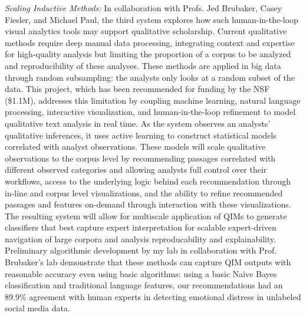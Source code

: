 \documentclass[11pt]{article}
\begin{document}
\emph{Scaling Inductive Methods:} In collaboration with Profs. Jed Brubaker, Casey Fiesler, and Michael Paul, the third system explores how such human-in-the-loop visual analytics tools may support qualitative scholarship. Current qualitative methods require deep manual data processing, integrating context and expertise for high-quality analysis but limiting the proportion of a corpus to be analyzed and reproducibility of these analyses. These methods are applied in big data through random subsampling: the analysts only looks at a random subset of the data. This project, which has been recommended for funding by the NSF (\$1.1M), addresses this limitation by coupling machine learning, natural language processing, interactive visualization, and human-in-the-loop refinement to model qualitative text analysis in real time. As the system observes an analysts' qualitative inferences, it uses active learning to construct statistical models correlated with analyst observations. These models will scale qualitative observations to the corpus level by recommending passages correlated with different observed categories and allowing analysts full control over their workflows, access to the underlying logic behind each recommendation through in-line and corpus level visualizations, and the ability to refine recommended passages and features on-demand through interaction with these visualizations.
The resulting system will allow for multiscale application of QIMs to generate classifiers that best capture expert interpretation for scalable expert-driven navigation of large corpora and analysis reproducability and explainability. 
Preliminary algorithmic development by my lab in collaboration with Prof. Brubaker's lab demonstrate that these methods can capture QIM outputs with reasonable accuracy even using basic algorithms: using a basic Na\"ive Bayes classification and traditional language features, our recommendations had an 89.9\% agreement with human experts in detecting emotional distress in unlabeled social media data.
\end{document}
